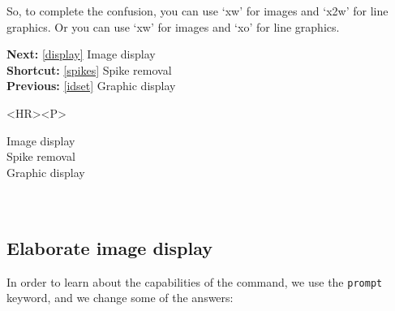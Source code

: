    So, to complete the confusion, you can use `xw' for images and `x2w'
   for line graphics. Or you can use `xw' for images and `xo' for line
   graphics.

\begin{latexonly}
{\bf Next:} \ref{display} Image display\\
{\bf Shortcut:} \ref{spikes} Spike removal\\
{\bf Previous:} \ref{idset} Graphic display\\
\end{latexonly}

\begin{htmlonly}
\begin{rawhtml} <HR><P> \end{rawhtml}
{\bf {}} Image display\\
{\bf {}} Spike removal\\
{\bf {}} Graphic display\\
{\bf {}}\\
{\bf {}}\\
\end{htmlonly}


\subsection{\label{display2}Elaborate image display}

   In order to learn about the capabilities of the
{\tt {}}
   command, we use the {\tt prompt} keyword, and we change some of
   the answers:

